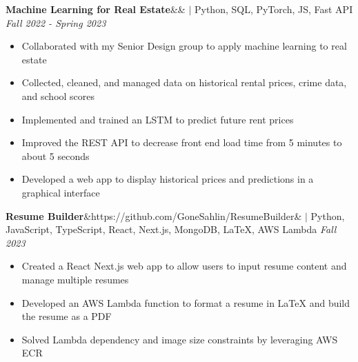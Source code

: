 \documentclass[11pt, a4paper, roman]{moderncv}
\newcommand{\project}[5]{
	\textbf{#1}\ifx&#2&{}
	\else
    		\href{#2}{\:\small\faGithub\:}\fi$|$ #3
	\hfill\textit{#4}
	#5
	\vspace{2mm}
}
\begin{document}
{\project{Machine Learning for Real Estate}{}{Python, SQL, PyTorch, JS, Fast API}{Fall 2022 - Spring 2023}
	{\begin{itemize}
		\item Collaborated with my Senior Design group to apply machine learning to real estate
		\item Collected, cleaned, and managed data on historical rental prices, crime data, and school scores
		\item Implemented and trained an LSTM to predict future rent prices
		\item Improved the REST API to decrease front end load time from 5 minutes to about 5 seconds
		\item Developed a web app to display historical prices and predictions in a graphical interface
	\end{itemize}}
}


{\project{Resume Builder}{https://github.com/GoneSahlin/ResumeBuilder}{Python, JavaScript, TypeScript, React, Next.js, MongoDB, LaTeX, AWS Lambda}{Fall 2023}
	{\begin{itemize}
		\item Created a React Next.js web app to allow users to input resume content and manage multiple resumes
		\item Developed an AWS Lambda function to format a resume in LaTeX and build the resume as a PDF
		\item Solved Lambda dependency and image size constraints by leveraging AWS ECR
	\end{itemize}}
}


\end{document}

